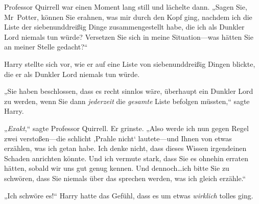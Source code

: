 Professor Quirrell war einen Moment lang still und lächelte dann. „Sagen Sie, Mr~Potter, können Sie erahnen, was mir durch den Kopf ging, nachdem ich die Liste der siebenunddreißig Dinge zusammengestellt habe, die ich als Dunkler Lord niemals tun würde? Versetzen Sie sich in meine Situation—was hätten Sie an meiner Stelle gedacht?“

Harry stellte sich vor, wie er auf eine Liste von siebenunddreißig Dingen blickte, die er als Dunkler Lord niemals tun würde.

„Sie haben beschlossen, dass es recht sinnlos wäre, überhaupt ein Dunkler Lord zu werden, wenn Sie dann \emph{jederzeit} die \emph{gesamte} Liste befolgen müssten,“ sagte Harry.

„\emph{Exakt},“ sagte Professor Quirrell. Er grinste. „Also werde ich nun gegen Regel zwei verstoßen—die schlicht ‚Prahle nicht‘ lautete—und Ihnen von etwas erzählen, was ich getan habe. Ich denke nicht, dass dieses Wissen irgendeinen Schaden anrichten könnte. Und ich vermute stark, dass Sie es ohnehin erraten hätten, sobald wir uns gut genug kennen. Und dennoch…ich bitte Sie zu schwören, dass Sie niemals über das sprechen werden, was ich gleich erzähle.“

„Ich schwöre es!“ Harry hatte das Gefühl, dass es um etwas \emph{wirklich} tolles ging.

